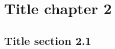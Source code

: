 \chapter{Title chapter 2}
\label{ch2}

\begin{spacing}{1} 
\end{spacing}
\doublespacing 

\kant[1]

\section{Title section 2.1}

\kant[1-3]